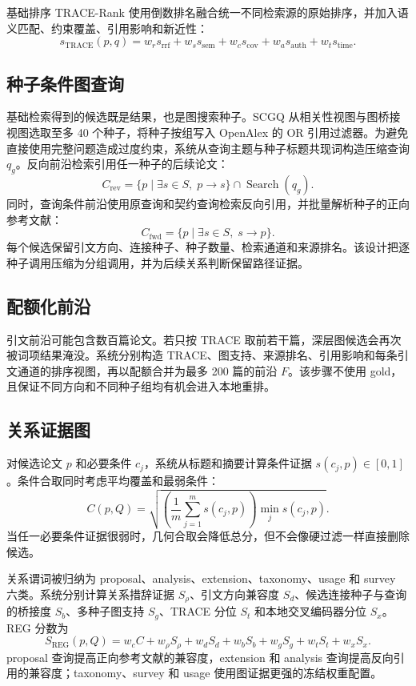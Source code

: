 \documentclass[a4paper,11pt]{ctexart}
\begin{document}
基础排序 TRACE-Rank 使用倒数排名融合统一不同检索源的原始排序，并加入语义匹配、约束覆盖、引用影响和新近性：
\begin{equation}
s_{\mathrm{TRACE}}(p,q)=w_r s_{\mathrm{rrf}}+w_s s_{\mathrm{sem}}+w_c s_{\mathrm{cov}}+w_a s_{\mathrm{auth}}+w_t s_{\mathrm{time}}.
\end{equation}

\subsection{种子条件图查询}
基础检索得到的候选既是结果，也是图搜索种子。SCGQ 从相关性视图与图桥接视图选取至多 40 个种子，将种子按组写入 OpenAlex 的 OR 引用过滤器。为避免直接使用完整问题造成过度约束，系统从查询主题与种子标题共现词构造压缩查询 $q_g$。反向前沿检索引用任一种子的后续论文：
\begin{equation}
C_{\mathrm{rev}}=\{p\mid \exists s\in S,\;p\rightarrow s\}\cap \operatorname{Search}(q_g).
\end{equation}
同时，查询条件前沿使用原查询和契约查询检索反向引用，并批量解析种子的正向参考文献：
\begin{equation}
C_{\mathrm{fwd}}=\{p\mid \exists s\in S,\;s\rightarrow p\}.
\end{equation}
每个候选保留引文方向、连接种子、种子数量、检索通道和来源排名。该设计把逐种子调用压缩为分组调用，并为后续关系判断保留路径证据。

\subsection{配额化前沿}
引文前沿可能包含数百篇论文。若只按 TRACE 取前若干篇，深层图候选会再次被词项结果淹没。系统分别构造 TRACE、图支持、来源排名、引用影响和每条引文通道的排序视图，再以配额合并为最多 200 篇的前沿 $F$。该步骤不使用 gold，且保证不同方向和不同种子组均有机会进入本地重排。

\subsection{关系证据图}
对候选论文 $p$ 和必要条件 $c_j$，系统从标题和摘要计算条件证据 $s(c_j,p)\in[0,1]$。条件合取同时考虑平均覆盖和最弱条件：
\begin{equation}
C(p,Q)=\sqrt{\left(\frac{1}{m}\sum_{j=1}^{m}s(c_j,p)\right)\min_j s(c_j,p)}.
\end{equation}
当任一必要条件证据很弱时，几何合取会降低总分，但不会像硬过滤一样直接删除候选。

关系谓词被归纳为 proposal、analysis、extension、taxonomy、usage 和 survey 六类。系统分别计算关系措辞证据 $S_\rho$、引文方向兼容度 $S_d$、候选连接种子与查询的桥接度 $S_b$、多种子图支持 $S_g$、TRACE 分位 $S_t$ 和本地交叉编码器分位 $S_x$。REG 分数为
\begin{equation}
S_{\mathrm{REG}}(p,Q)=w_cC+w_\rho S_\rho+w_dS_d+w_bS_b+w_gS_g+w_tS_t+w_xS_x.
\end{equation}
proposal 查询提高正向参考文献的兼容度，extension 和 analysis 查询提高反向引用的兼容度；taxonomy、survey 和 usage 使用图证据更强的冻结权重配置。
\end{document}
